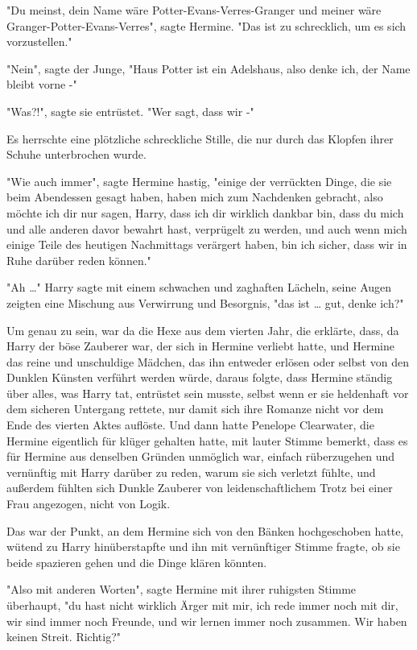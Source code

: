 {"Du meinst, dein Name wäre Potter-Evans-Verres-Granger und meiner wäre Granger-Potter-Evans-Verres", sagte Hermine. "Das ist zu schrecklich, um es sich vorzustellen."

"Nein", sagte der Junge, "Haus Potter ist ein Adelshaus, also denke ich, der Name bleibt vorne -"

"Was?!", sagte sie entrüstet. "Wer sagt, dass wir -"

Es herrschte eine plötzliche schreckliche Stille, die nur durch das Klopfen ihrer Schuhe unterbrochen wurde.

"Wie auch immer", sagte Hermine hastig, "einige der verrückten Dinge, die sie beim Abendessen gesagt haben, haben mich zum Nachdenken gebracht, also möchte ich dir nur sagen, Harry, dass ich dir wirklich dankbar bin, dass du mich und alle anderen davor bewahrt hast, verprügelt zu werden, und auch wenn mich einige Teile des heutigen Nachmittags verärgert haben, bin ich sicher, dass wir in Ruhe darüber reden können."

"Ah …" Harry sagte mit einem schwachen und zaghaften Lächeln, seine Augen zeigten eine Mischung aus Verwirrung und Besorgnis, "das ist … gut, denke ich?"

Um genau zu sein, war da die Hexe aus dem vierten Jahr, die erklärte, dass, da Harry der böse Zauberer war, der sich in Hermine verliebt hatte, und Hermine das reine und unschuldige Mädchen, das ihn entweder erlösen oder selbst von den Dunklen Künsten verführt werden würde, daraus folgte, dass Hermine ständig über alles, was Harry tat, entrüstet sein musste, selbst wenn er sie heldenhaft vor dem sicheren Untergang rettete, nur damit sich ihre Romanze nicht vor dem Ende des vierten Aktes auflöste. Und dann hatte Penelope Clearwater, die Hermine eigentlich für klüger gehalten hatte, mit lauter Stimme bemerkt, dass es für Hermine aus denselben Gründen unmöglich war, einfach rüberzugehen und vernünftig mit Harry darüber zu reden, warum sie sich verletzt fühlte, und außerdem fühlten sich Dunkle Zauberer von leidenschaftlichem Trotz bei einer Frau angezogen, nicht von Logik.

Das war der Punkt, an dem Hermine sich von den Bänken hochgeschoben hatte, wütend zu Harry hinüberstapfte und ihn mit vernünftiger Stimme fragte, ob sie beide spazieren gehen und die Dinge klären könnten.

"Also mit anderen Worten", sagte Hermine mit ihrer ruhigsten Stimme überhaupt, "du hast nicht wirklich Ärger mit mir, ich rede immer noch mit dir, wir sind immer noch Freunde, und wir lernen immer noch zusammen. Wir haben keinen Streit. Richtig?"

}
